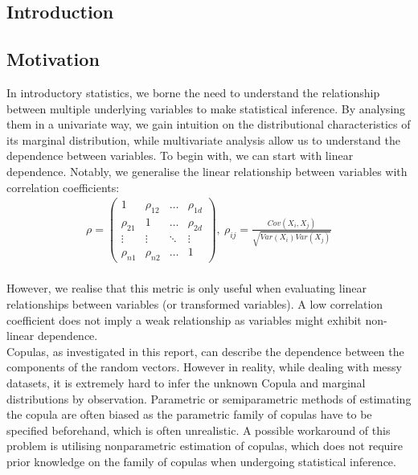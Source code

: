 \documentclass[12pt]{report}
\newcommand{\1}{\mathbf{1}}
\begin{document}
\newpage
\begin{flushleft}
\sectionfont{\fontsize{20}{15}\selectfont}
\subsectionfont{\fontsize{17}{15}\selectfont}
\section{Introduction}
\vspace{0.5cm}
\subsection{Motivation}
\vspace{0.5cm}
\normalsize
In introductory statistics, we borne the need to understand the relationship between multiple underlying variables to make statistical inference. By analysing them in a univariate way, we gain intuition on the distributional characteristics of its marginal distribution, while multivariate analysis allow us to understand the dependence between variables. To begin with, we can start with linear dependence. Notably, we generalise the linear relationship between variables with correlation coefficients: \\
\vspace{0.5cm}
\begin{align*}
\rho = \begin{pmatrix} 
    1 & \rho_{12} & \dots & \rho_{1d} \\
    \rho_{21} & 1 & \dots & \rho_{2d} \\
    \vdots & \vdots & \ddots & \vdots \\
    \rho_{n1} & \rho_{n2} & \dots & 1
\end{pmatrix}
, \: \rho_{ij} = \frac{Cov(X_{i},X_{j})}{\sqrt{Var(X_{i})Var(X_{j})}}
\end{align*} \\
\vspace{0.5cm}
However, we realise that this metric is only useful when evaluating linear relationships between variables (or transformed variables). A low correlation coefficient does not imply a weak relationship as variables might exhibit non-linear dependence. \\
\vspace{0.5cm}
Copulas, as investigated in this report, can describe the dependence between the components of the random vectors. However in reality, while dealing with messy datasets, it is extremely hard to infer the unknown Copula and marginal distributions by observation. Parametric or semiparametric methods of estimating the copula are often biased as the parametric family of copulas have to be specified beforehand, which is often unrealistic. A possible workaround of this problem is utilising nonparametric estimation of copulas, which does not require prior knowledge on the family of copulas when undergoing statistical inference. \\

\end{flushleft}
\end{document}
